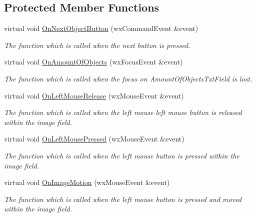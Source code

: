 \subsection*{Protected Member Functions}
\begin{DoxyCompactItemize}
\item 
virtual void \hyperlink{classGUIFrame_a612360711e53bf7076ed820d77884239}{OnNextObjectButton} (wxCommandEvent \&event)
\begin{DoxyCompactList}\small\item\em The function which is called when the next button is pressed. \item\end{DoxyCompactList}\item 
virtual void \hyperlink{classGUIFrame_a7e82e5ef92c76ac1f778da6d7fa3118c}{OnAmountOfObjects} (wxFocusEvent \&event)
\begin{DoxyCompactList}\small\item\em The function which is called when the focus on AmountOfObjectsTxtField is lost. \item\end{DoxyCompactList}\item 
virtual void \hyperlink{classGUIFrame_a627414f0cfaeeb92d63150fc8ae99775}{OnLeftMouseRelease} (wxMouseEvent \&event)
\begin{DoxyCompactList}\small\item\em The function which is called when the left mouse left mouse button is released within the image field. \item\end{DoxyCompactList}\item 
virtual void \hyperlink{classGUIFrame_ad09151902fc514a484bbe9e92a8570c7}{OnLeftMousePressed} (wxMouseEvent \&event)
\begin{DoxyCompactList}\small\item\em The function which is called when the left mouse button is pressed within the image field. \item\end{DoxyCompactList}\item 
virtual void \hyperlink{classGUIFrame_a588456ea3bcec8dfcdd6be64497cba9f}{OnImageMotion} (wxMouseEvent \&event)
\begin{DoxyCompactList}\small\item\em The function which is called when the left mouse button is pressed and moved within the image field. \item\end{DoxyCompactList}\item 

\end{DoxyCompactItemize}
